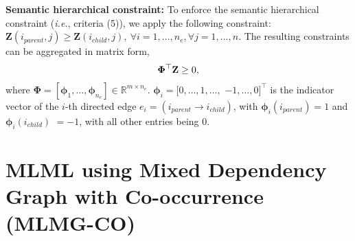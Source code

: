 \documentclass[twocolumn]{svjour3}          %
\begin{document}
\vspace{0.5em}  \noindent
{\bf Semantic hierarchical constraint:}
To enforce the semantic hierarchical constraint ({\it i.e.}, criteria (5)), we apply the following constraint: $\mathbf{Z}(i_{parent}, j) \geq \mathbf{Z}(i_{child}, j),~\forall i = 1, \ldots, n_e,  \forall j = 1, \ldots, n$.
The resulting constraints can be aggregated in matrix form,
\begin{eqnarray}
\vspace{-0.1in}
\mathbf{\Phi}^\top \mathbf{Z} \geq 0,
  \label{eq: semantic hierarchy constraint}
\vspace{-0.1in}
\end{eqnarray}
where $\mathbf{\Phi} = [\boldsymbol{\phi}_1, \ldots, \boldsymbol{\phi}_{n_e}] \in \mathbb{R}^{m \times n_e}$. $\boldsymbol{\phi}_i = [0, \ldots, 1, \ldots,$ $-1, \ldots, 0]^\top$ is the indicator vector of the $i$-th directed edge $e_i = (i_{parent} \rightarrow i_{child})$, with $\boldsymbol{\phi}_i(i_{parent}) =1$ and $\boldsymbol{\phi}_i(i_{child})$ $= -1$, with all other entries being 0.


\section{MLML using Mixed Dependency Graph with Co-occurrence (MLMG-CO)}
\label{sec: 3 subsec objective function}
\end{document}
